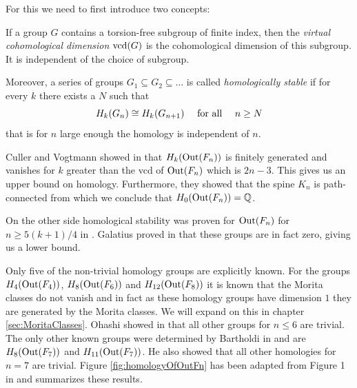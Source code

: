 For this we need to first introduce two concepts:
\begin{definition}
	If a group $G$ contains a torsion-free subgroup of finite index, then the \emph{virtual cohomological dimension} $\operatorname{vcd}(G)$
is the cohomological dimension of this subgroup. It is independent of the choice of subgroup.

Moreover, a series of groups $G_1 \subseteq G_2 \subseteq \ldots$ is called \emph{homologically stable} if for every $k$ 
there exists a $N$ such that 
\[
	H_{k}(G_{n}) \cong H_{k}(G_{n+1}) \qq{ for all } n \geq N
\]
that is for $n$ large enough the homology is independent of  $n$.
\end{definition}

Culler and Vogtmann showed in \cite{vogtmann86} that $H_{k}(\operatorname{Out}(F_{n}))$ is finitely generated and vanishes for $k$ greater
than the vcd of $\operatorname{Out}(F_{n})$ which is $2n -3$. This gives us an upper bound on homology.
Furthermore, they showed that the spine $K_{n}$ is path-connected from which we conclude that $H_0(\operatorname{Out}(F_{n})) = \mathbb{Q}$.

On the other side homological stability was proven for $\operatorname{Out}(F_{n})$ for $n \geq 5 (k+1) / 4$ in \cite{hatcher04,hatcher98}.
Galatius proved in \cite{galatius11} that these groups are in fact zero, giving us a lower bound.

Only five of the non-trivial homology groups are explicitly known.
For the groups $H_{4}(\operatorname{Out}(F_{4}))$, $H_{8}(\operatorname{Out}(F_{6}))$ and $H_{12}(\operatorname{Out}(F_{8}))$ it is known 
that the Morita classes do not vanish and in fact as these homology groups have dimension $1$ they are generated by the Morita classes.
We will expand on this in chapter \ref{sec:MoritaClasses}.
Ohashi showed in \cite{ohashi08} that all other groups for $n \leq 6$ are trivial. 
The only other known groups were determined by Bartholdi in \cite{bartholdi16} and are
$H_{8}(\operatorname{Out}(F_{7}))$ and $H_{11}(\operatorname{Out}(F_{7}))$. He also showed that all other homologies for $n = 7$ are trivial.
Figure \ref{fig:homologyOfOutFn} has been adapted from Figure 1 in \cite{conant16} and summarizes these results.

